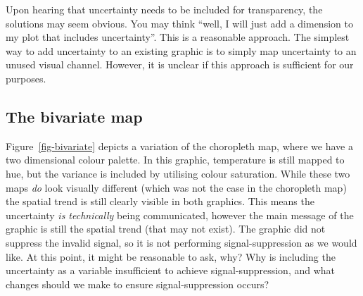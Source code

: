 \documentclass[
  12pt]{article}
\begin{document}
Upon hearing that uncertainty needs to be included for transparency, the
solutions may seem obvious. You may think ``well, I will just add a
dimension to my plot that includes uncertainty''. This is a reasonable
approach. The simplest way to add uncertainty to an existing graphic is
to simply map uncertainty to an unused visual channel. However, it is
unclear if this approach is sufficient for our purposes.

\subsection{The bivariate map}\label{the-bivariate-map}

Figure~\ref{fig-bivariate} depicts a variation of the choropleth map,
where we have a two dimensional colour palette. In this graphic,
temperature is still mapped to hue, but the variance is included by
utilising colour saturation. While these two maps \emph{do} look
visually different (which was not the case in the choropleth map) the
spatial trend is still clearly visible in both graphics. This means the
uncertainty \emph{is technically} being communicated, however the main
message of the graphic is still the spatial trend (that may not exist).
The graphic did not suppress the invalid signal, so it is not performing
signal-suppression as we would like. At this point, it might be
reasonable to ask, why? Why is including the uncertainty as a variable
insufficient to achieve signal-suppression, and what changes should we
make to ensure signal-suppression occurs?
\end{document}
